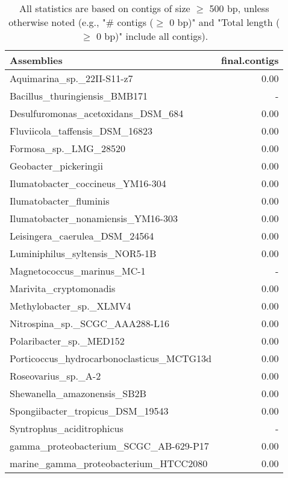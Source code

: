 \documentclass[12pt,a4paper]{article}
\begin{document}
\begin{table}[ht]
\begin{center}
\caption{All statistics are based on contigs of size $\geq$ 500 bp, unless otherwise noted (e.g., "\# contigs ($\geq$ 0 bp)" and "Total length ($\geq$ 0 bp)" include all contigs).}
\begin{tabular}{|l*{1}{|r}|}
\hline
Assemblies & final.contigs \\ \hline
Aquimarina\_sp.\_22II-S11-z7 & 0.00 \\ \hline
Bacillus\_thuringiensis\_BMB171 & - \\ \hline
Desulfuromonas\_acetoxidans\_DSM\_684 & 0.00 \\ \hline
Fluviicola\_taffensis\_DSM\_16823 & 0.00 \\ \hline
Formosa\_sp.\_LMG\_28520 & 0.00 \\ \hline
Geobacter\_pickeringii & 0.00 \\ \hline
Ilumatobacter\_coccineus\_YM16-304 & 0.00 \\ \hline
Ilumatobacter\_fluminis & 0.00 \\ \hline
Ilumatobacter\_nonamiensis\_YM16-303 & 0.00 \\ \hline
Leisingera\_caerulea\_DSM\_24564 & 0.00 \\ \hline
Luminiphilus\_syltensis\_NOR5-1B & 0.00 \\ \hline
Magnetococcus\_marinus\_MC-1 & - \\ \hline
Marivita\_cryptomonadis & 0.00 \\ \hline
Methylobacter\_sp.\_XLMV4 & 0.00 \\ \hline
Nitrospina\_sp.\_SCGC\_AAA288-L16 & 0.00 \\ \hline
Polaribacter\_sp.\_MED152 & 0.00 \\ \hline
Porticoccus\_hydrocarbonoclasticus\_MCTG13d & 0.00 \\ \hline
Roseovarius\_sp.\_A-2 & 0.00 \\ \hline
Shewanella\_amazonensis\_SB2B & 0.00 \\ \hline
Spongiibacter\_tropicus\_DSM\_19543 & 0.00 \\ \hline
Syntrophus\_aciditrophicus & - \\ \hline
gamma\_proteobacterium\_SCGC\_AB-629-P17 & 0.00 \\ \hline
marine\_gamma\_proteobacterium\_HTCC2080 & 0.00 \\ \hline
\end{tabular}
\end{center}
\end{table}
\end{document}
